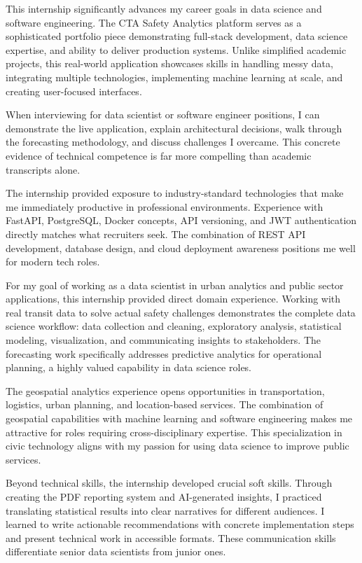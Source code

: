 \documentclass[12pt,letterpaper]{article}
\begin{document}
This internship significantly advances my career goals in data science and software engineering. The CTA Safety Analytics platform serves as a sophisticated portfolio piece demonstrating full-stack development, data science expertise, and ability to deliver production systems. Unlike simplified academic projects, this real-world application showcases skills in handling messy data, integrating multiple technologies, implementing machine learning at scale, and creating user-focused interfaces.

When interviewing for data scientist or software engineer positions, I can demonstrate the live application, explain architectural decisions, walk through the forecasting methodology, and discuss challenges I overcame. This concrete evidence of technical competence is far more compelling than academic transcripts alone.

The internship provided exposure to industry-standard technologies that make me immediately productive in professional environments. Experience with FastAPI, PostgreSQL, Docker concepts, API versioning, and JWT authentication directly matches what recruiters seek. The combination of REST API development, database design, and cloud deployment awareness positions me well for modern tech roles.

For my goal of working as a data scientist in urban analytics and public sector applications, this internship provided direct domain experience. Working with real transit data to solve actual safety challenges demonstrates the complete data science workflow: data collection and cleaning, exploratory analysis, statistical modeling, visualization, and communicating insights to stakeholders. The forecasting work specifically addresses predictive analytics for operational planning, a highly valued capability in data science roles.

The geospatial analytics experience opens opportunities in transportation, logistics, urban planning, and location-based services. The combination of geospatial capabilities with machine learning and software engineering makes me attractive for roles requiring cross-disciplinary expertise. This specialization in civic technology aligns with my passion for using data science to improve public services.

Beyond technical skills, the internship developed crucial soft skills. Through creating the PDF reporting system and AI-generated insights, I practiced translating statistical results into clear narratives for different audiences. I learned to write actionable recommendations with concrete implementation steps and present technical work in accessible formats. These communication skills differentiate senior data scientists from junior ones.
\end{document}
